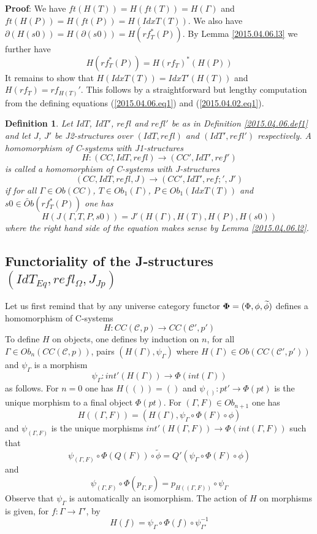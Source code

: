 \documentclass[12pt]{article}
\newenvironment{myproof}{{\bf Proof}:}{\vskip 5mm }
\newtheorem{definition}[proposition]{Definition}
\newcommand{\llabel}[1]{\label{#1}}
\newcommand{\sr}{\rightarrow}
\newcommand{\wt}{\widetilde}
\begin{document}
%
\begin{myproof}
We have $ft(H(T))=H(ft(T))=H(\Gamma)$ and $ft(H(P))=H(ft(P))=H(IdxT(T))$. We also have $\partial(H(s0))=H(\partial(s0))=H(rf_T^*(P))$. By Lemma \ref{2015.04.06.l3} we further have
%
$$H(rf_T^*(P))=H(rf_T)^*(H(P))$$
%
It remains to show that $H(IdxT(T))=IdxT'(H(T))$ and $H(rf_T)=rf_{H(T)}'$. This follows by a straightforward but lengthy computation from the defining equations (\ref{2015.04.06.eq1}) and (\ref{2015.04.02.eq1}).
\end{myproof}
%
\begin{definition}
\llabel{2015.04.06.def2}
Let $IdT$, $IdT'$, $refl$ and $refl'$ be as in Definition \ref{2015.04.06.def1} and let $J$, $J'$ be J2-structures over $(IdT,refl)$ and $(IdT',refl')$ respectively. A homomorphism of C-systems with J1-structures 
%
$$H:(CC,IdT,refl)\sr (CC',IdT',ref')$$
%
is called a homomorphism of C-systems with J-structures 
%
$$(CC,IdT,refl,J)\sr (CC',IdT',ref;',J')$$
%
if for all $\Gamma\in Ob(CC)$, $T\in Ob_1(\Gamma)$, $P\in Ob_1(IdxT(T))$ and $s0\in \wt{Ob}(rf_T^*(P))$ one has
%
$$H(J(\Gamma,T,P,s0))=J'(H(\Gamma),H(T),H(P),H(s0))$$
%
where the right hand side of the equation makes sense by Lemma \ref{2015.04.06.l2}.
\end{definition}
%











\subsection{Functoriality of the J-structures $(IdT_{Eq},refl_{\Omega},J_{Jp})$}
%
\label{2015.04.12.sec1}
%
Let us first remind that by \cite[Construction 3.3]{Cfromauniverse} any universe category functor ${\bf \Phi}=(\Phi,\phi,\wt{\phi})$ defines a homomorphism of C-systems
%
$$H:CC({\mathcal C},p)\sr CC({\mathcal C}',p')$$
%
To define $H$ on objects, one defines by induction on $n$, for all $\Gamma\in Ob_n(CC({\mathcal C},p))$,  pairs $(H(\Gamma),\psi_{\Gamma})$ where $H(\Gamma)\in Ob(CC({\mathcal C}',p'))$ and $\psi_{\Gamma}$ is a morphism 
%
$$\psi_{\Gamma}:int'(H(\Gamma))\sr \Phi(int(\Gamma))$$
%
as follows. For $n=0$ one has $H(())=()$ and $\psi_{()}:pt'\sr \Phi(pt)$ is the unique morphism to a final object $\Phi(pt)$. For $(\Gamma,F)\in Ob_{n+1}$ one has 
%
$$H((\Gamma,F))=(H(\Gamma),\psi_{\Gamma}\circ\Phi(F)\circ \phi)$$
%
and $\psi_{(\Gamma,F)}$ is the unique morphisms $int'(H(\Gamma,F))\sr \Phi(int(\Gamma,F))$ such that
%
$$\psi_{(\Gamma,F)}\circ \Phi(Q(F))\circ\wt{\phi}=Q'(\psi_{\Gamma}\circ\Phi(F)\circ\phi)$$
%
and
%
$$\psi_{(\Gamma,F)}\circ \Phi(p_{\Gamma,F})=p_{H((\Gamma,F))}\circ \psi_{\Gamma}$$
%
Observe that $\psi_{\Gamma}$ is automatically an isomorphism. The action of $H$ on morphisms is given, for $f:\Gamma\sr\Gamma'$, by
%
$$H(f)=\psi_{\Gamma}\circ\Phi(f)\circ\psi_{\Gamma'}^{-1}$$
%
\end{document}
